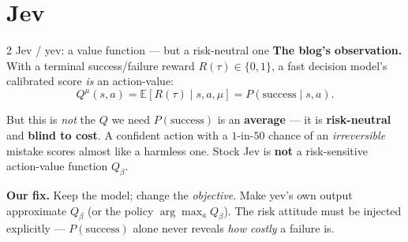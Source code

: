 \documentclass[aspectratio=169,11pt]{beamer}
\newcommand{\E}{\mathbb{E}}
\begin{document}
\section{Jev}
\begin{frame}{2 \quad Jev / yev: a value function --- but a risk-neutral one}
  \textbf{The blog's observation.} With a terminal success/failure reward $R(\tau)\in\{0,1\}$,
  a fast decision model's calibrated score \emph{is} an action-value:
  \[
     Q^{\mu}(s,a)=\E[R(\tau)\mid s,a,\mu]=P(\text{success}\mid s,a).
  \]
  \vspace{1mm}
  \begin{alertblock}{But this is \emph{not} the $Q$ we need}
  $P(\text{success})$ is an \textbf{average} --- it is \textbf{risk-neutral} and \textbf{blind to cost}.
  A confident action with a $1$-in-$50$ chance of an \emph{irreversible} mistake scores
  almost like a harmless one. Stock Jev is \textbf{not} a risk-sensitive action-value
  function $Q_\beta$.
  \end{alertblock}
  \textbf{Our fix.} Keep the model; change the \emph{objective}. Make yev's own output
  approximate $Q_\beta$ (or the policy $\arg\max_a Q_\beta$). The risk attitude must be
  injected explicitly --- $P(\text{success})$ alone never reveals \emph{how costly} a failure is.
\end{frame}

\end{document}
